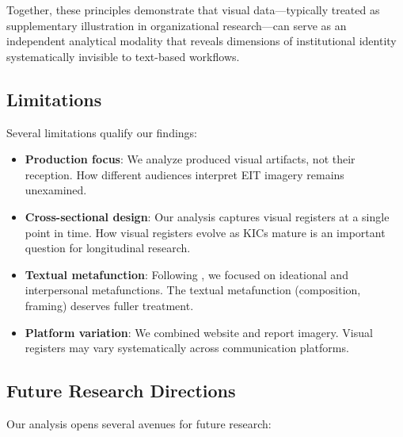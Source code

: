 \documentclass[../main.tex]{subfiles}
\begin{document}
Together, these principles demonstrate that visual data---typically treated as supplementary illustration in organizational research---can serve as an independent analytical modality that reveals dimensions of institutional identity systematically invisible to text-based workflows.

\subsection{Limitations}

Several limitations qualify our findings:
\begin{itemize}
    \item \textbf{Production focus}: We analyze produced visual artifacts, not their reception. How different audiences interpret EIT imagery remains unexamined.

    \item \textbf{Cross-sectional design}: Our analysis captures visual registers at a single point in time. How visual registers evolve as KICs mature is an important question for longitudinal research.

    \item \textbf{Textual metafunction}: Following \cite{jancsary2018institutions}, we focused on ideational and interpersonal metafunctions. The textual metafunction (composition, framing) deserves fuller treatment.

    \item \textbf{Platform variation}: We combined website and report imagery. Visual registers may vary systematically across communication platforms.
\end{itemize}

\subsection{Future Research Directions}

Our analysis opens several avenues for future research:
\end{document}

